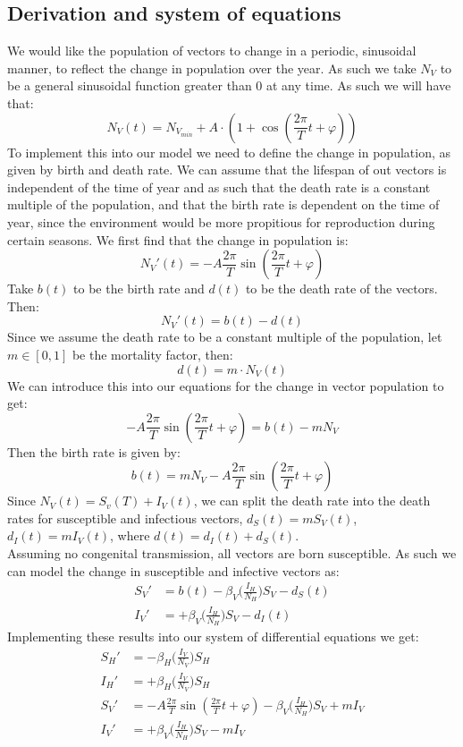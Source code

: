 \subsection*{Derivation and system of equations}
We would like the population of vectors to change in a periodic, sinusoidal manner, to reflect the change in population over the year. As such we take $N_V$ to be a general sinusoidal function greater than 0 at any time. As such we will have that:
$$
N_V(t) = N_{V_{min}} + A \cdot (1+\cos(\frac{2\pi}{T}t + \varphi))
$$
To implement this into our model we need to define the change in population, as given by birth and death rate. We can assume that the lifespan of out vectors is independent of the time of year and as such that the death rate is a constant multiple of the population, and that the birth rate is dependent on the time of year, since the environment would be more propitious for reproduction during certain seasons. We first find that the change in population is:
$$
N_V'(t) = - A \frac{2\pi}{T}\sin(\frac{2\pi}{T}t + \varphi)
$$
Take $b(t)$ to be the birth rate and $d(t)$ to be the death rate of the vectors. Then:
$$
N_V'(t) = b(t) - d(t)
$$
Since we assume the death rate to be a constant multiple of the population, let $m \in [0,1]$ be the mortality factor, then:
$$
d(t) = m \cdot N_V(t)
$$
We can introduce this into our equations for the change in vector population to get:
$$
 - A \frac{2\pi}{T}\sin(\frac{2\pi}{T}t + \varphi) = b(t) - mN_V
$$
Then the birth rate is given by:
$$
b(t) = mN_V - A \frac{2\pi}{T}\sin(\frac{2\pi}{T}t + \varphi)
$$
Since $N_V(t) = S_v(T) + I_V(t)$, we can split the death rate into the death rates for susceptible and infectious vectors, $d_S(t) = mS_V(t)$, $d_I(t) = mI_V(t)$, where $d(t) = d_I(t) + d_S(t)$.\\
Assuming no congenital transmission, all vectors are born susceptible. As such we can model the change in susceptible and infective vectors as:
\begin{equation*}
    \begin{split}
        S_V' & = b(t)-\beta_V \bigg( \frac{I_H}{N_H}\bigg)S_V - d_S(t) \\
        I_V' & = +\beta_V \bigg( \frac{I_H}{N_H}\bigg)S_V - d_I(t)
    \end{split}
\end{equation*}
Implementing these results into our system of differential equations we get:
\begin{equation*}
    \begin{split}
        S_H' & = -\beta_H \bigg( \frac{I_V}{N_V}\bigg)S_H\\
        I_H' & = +\beta_H \bigg( \frac{I_V}{N_V}\bigg)S_H\\
        S_V' & = - A \frac{2\pi}{T}\sin(\frac{2\pi}{T}t + \varphi) -\beta_V \bigg( \frac{I_H}{N_H}\bigg)S_V + mI_V \\
        I_V' & = +\beta_V \bigg( \frac{I_H}{N_H}\bigg)S_V - mI_V
    \end{split}
\end{equation*}